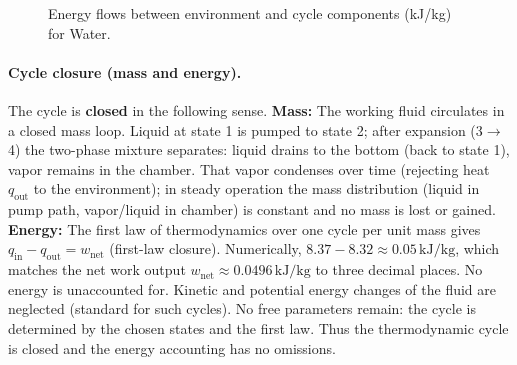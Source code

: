 \documentclass[11pt,a4paper]{article}
\begin{document}
\begin{figure}[htbp]
\centering
{}
\caption{Energy flows between environment and cycle components (kJ/kg) for Water.}
\label{fig:energy_flow}
\end{figure}

\paragraph{Cycle closure (mass and energy).} The cycle is \textbf{closed} in the
following sense. \textbf{Mass:} The working fluid circulates in a closed mass loop.
Liquid at state 1 is pumped to state 2; after expansion (3$\to$4) the two-phase
mixture separates: liquid drains to the bottom (back to state 1), vapor
remains in the chamber. That vapor condenses over time (rejecting heat
$q_{\mathrm{out}}$ to the environment); in steady operation the mass
distribution (liquid in pump path, vapor/liquid in chamber) is constant and
no mass is lost or gained. \textbf{Energy:} The first law of thermodynamics over one cycle per unit
mass gives $q_{\mathrm{in}} - q_{\mathrm{out}} = w_{\mathrm{net}}$ (first-law closure). 
Numerically, $8.37 - 8.32 \approx 0.05\,\mathrm{kJ}/\mathrm{kg}$, which 
matches the net work output $w_{\mathrm{net}} \approx 0.0496\,\mathrm{kJ}/\mathrm{kg}$ 
to three decimal places. No energy is unaccounted for.
Kinetic and potential energy changes of the fluid are neglected (standard for
such cycles). No free parameters remain: the cycle is determined by the chosen states and the first law. Thus the thermodynamic cycle is closed and the energy accounting
has no omissions.
\end{document}
